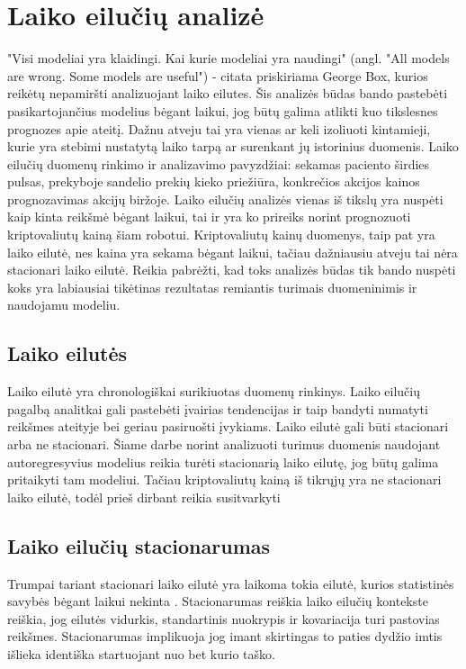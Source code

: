 \documentclass{VUMIFInfKursinis}
\begin{document}
\section{Laiko eilučių analizė}
"Visi modeliai yra klaidingi. Kai kurie modeliai yra naudingi" (angl. "All models are wrong. Some models are useful") - citata priskiriama George Box, kurios
reikėtų nepamiršti analizuojant laiko eilutes. Šis analizės būdas bando pastebėti pasikartojančius modelius bėgant laikui, jog būtų galima atlikti kuo tikslesnes
prognozes apie ateitį. 
Dažnu atveju tai yra vienas ar keli izoliuoti kintamieji, kurie yra stebimi nustatytą laiko tarpą ar surenkant jų istorinius duomenis. Laiko eilučių duomenų 
rinkimo ir analizavimo pavyzdžiai: sekamas paciento širdies pulsas, prekyboje sandelio prekių kieko priežiūra, konkrečios akcijos kainos prognozavimas akcijų biržoje. 
Laiko eilučių analizės vienas iš tikslų yra nuspėti kaip kinta reikšmė bėgant laikui, tai ir yra ko prireiks norint prognozuoti kriptovaliutų kainą šiam robotui. 
Kriptovaliutų kainų duomenys, taip pat yra laiko eilutė, nes kaina yra sekama bėgant laikui, tačiau dažniausiu atveju tai nėra stacionari laiko eilutė.
Reikia pabrėžti, kad toks analizės būdas tik bando nuspėti koks yra labiausiai tikėtinas rezultatas remiantis turimais duomeninimis ir naudojamu modeliu. 

\subsection {Laiko eilutės}
Laiko eilutė yra chronologiškai surikiuotas duomenų rinkinys. Laiko eilučių pagalbą analitkai gali pastebėti įvairias tendencijas ir taip bandyti numatyti reikšmes
ateityje bei geriau pasiruošti įvykiams. Laiko eilutė gali būti stacionari arba ne stacionari. Šiame darbe norint analizuoti turimus duomenis naudojant 
autoregresyvius modelius reikia turėti stacionarią laiko eilutę, jog būtų galima pritaikyti tam modeliui. Tačiau kriptovaliutų kainą iš tikrųjų yra
ne stacionari laiko eilutė, todėl prieš dirbant reikia susitvarkyti

\subsection {Laiko eilučių stacionarumas}
Trumpai tariant stacionari laiko eilutė yra laikoma tokia eilutė, kurios statistinės savybės bėgant laikui nekinta \cite{nason2006stationary}. 
Stacionarumas reiškia laiko eilučių kontekste reiškia, jog eilutės vidurkis, standartinis nuokrypis ir kovariacija turi pastovias reikšmes. 
Stacionarumas implikuoja jog imant skirtingas to paties dydžio imtis išlieka identiška startuojant nuo bet kurio taško.
\end{document}
